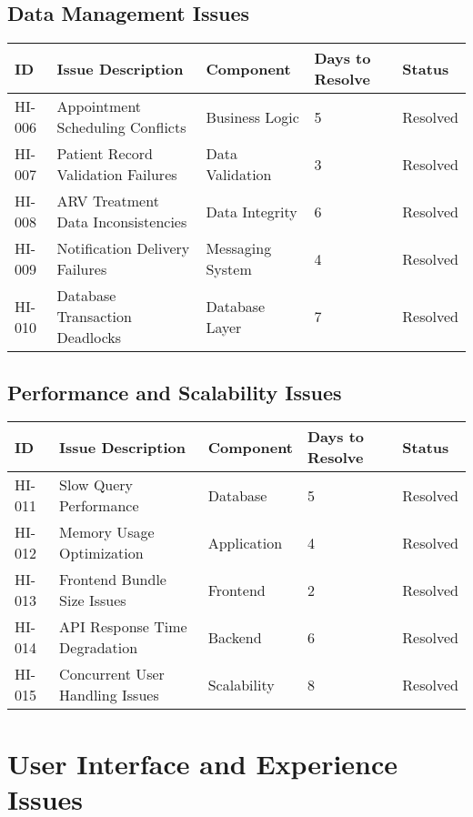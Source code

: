 \documentclass[12pt,a4paper]{article}
\begin{document}
\subsection{Data Management Issues}

\begin{longtable}{|p{1cm}|p{5cm}|p{2cm}|p{2cm}|p{2cm}|}
\hline
\textbf{ID} & \textbf{Issue Description} & \textbf{Component} & \textbf{Days to Resolve} & \textbf{Status} \\
\hline
HI-006 & Appointment Scheduling Conflicts & Business Logic & 5 & \cellcolor{green!30}Resolved \\
\hline
HI-007 & Patient Record Validation Failures & Data Validation & 3 & \cellcolor{green!30}Resolved \\
\hline
HI-008 & ARV Treatment Data Inconsistencies & Data Integrity & 6 & \cellcolor{green!30}Resolved \\
\hline
HI-009 & Notification Delivery Failures & Messaging System & 4 & \cellcolor{green!30}Resolved \\
\hline
HI-010 & Database Transaction Deadlocks & Database Layer & 7 & \cellcolor{green!30}Resolved \\
\hline
\end{longtable}

\subsection{Performance and Scalability Issues}

\begin{longtable}{|p{1cm}|p{5cm}|p{2cm}|p{2cm}|p{2cm}|}
\hline
\textbf{ID} & \textbf{Issue Description} & \textbf{Component} & \textbf{Days to Resolve} & \textbf{Status} \\
\hline
HI-011 & Slow Query Performance & Database & 5 & \cellcolor{green!30}Resolved \\
\hline
HI-012 & Memory Usage Optimization & Application & 4 & \cellcolor{green!30}Resolved \\
\hline
HI-013 & Frontend Bundle Size Issues & Frontend & 2 & \cellcolor{green!30}Resolved \\
\hline
HI-014 & API Response Time Degradation & Backend & 6 & \cellcolor{green!30}Resolved \\
\hline
HI-015 & Concurrent User Handling Issues & Scalability & 8 & \cellcolor{green!30}Resolved \\
\hline
\end{longtable}

\section{User Interface and Experience Issues}
\end{document}
